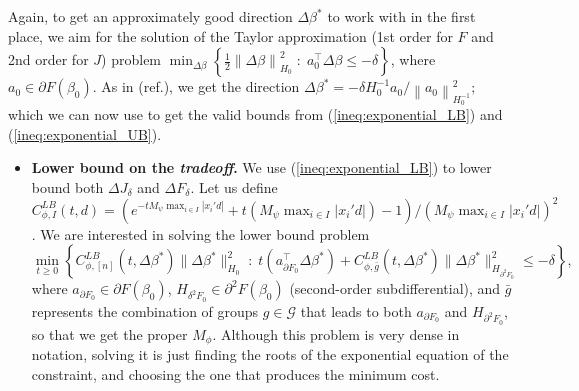 \documentclass[11pt]{article}
\theoremstyle{plain}
\theoremstyle{definition}
\newcommand{\norm}[1]{\left\lVert #1 \right\rVert}
\newcommand{\1}{\mathbf{1}}
\newcommand{\G}{\mathcal{G}}
\renewcommand{\t}{^{\top}}
\begin{document}
Again, to get an approximately good direction $\Delta \beta^*$ to work with in the first place, we aim for the solution of the Taylor approximation (1st order for $F$ and 2nd order for $J$)  problem  $\min_{\Delta \beta } \left\{\frac{1}{2} \norm{\Delta \beta}_{H_0}^2 \;:\; a_0\t \Delta \beta \leq -\delta \right\}$, where $a_0 \in \partial F(\beta_0)$. As in {\color{red} (ref.)}, we get the direction $\Delta \beta^* = -\delta H_0^{-1}a_0/\norm{a_0}^2_{H_0^{-1}}$; which we can now use to get the valid bounds from (\ref{ineq:exponential_LB}) and (\ref{ineq:exponential_UB}).
\begin{itemize}
    \item \noindent \textbf{Lower bound on the \textit{tradeoff}.}
We use (\ref{ineq:exponential_LB}) to lower bound both $\Delta J_\delta$ and $\Delta F_\delta$. Let us define $C_{\phi,I}^{LB}(t,d) = (e^{-tM_\psi \max_{i\in I}|x_i'd|}+t(M_\psi\max_{i\in I}|x_i'd|)-1 )/(M_\psi\max_{i\in I}|x_i'd|)^2$. We are interested in solving the lower bound problem \begin{equation}
\min_{t\geq 0} \left\{ C_{\phi,[n]}^{LB}(t, \Delta \beta^*)\|{\Delta \beta^*}\|_{H_0}^2  \;:\; t(a_{\partial F_0}\t {\Delta \beta^*}) + C_{\phi,\bar{g}}^{LB}(t, \Delta \beta^*)\|{\Delta \beta^*}\|_{H_{\partial^2 F_0}}^2 \leq -\delta \right\},    
\end{equation}
 where $a_{\partial F_0} \in \partial F(\beta_0)$, $H_{\delta^2F_0} \in \partial^2F(\beta_0)$ (second-order subdifferential), and $\bar{g}$ represents the combination of groups $g\in \G$ that leads to both $a_{\partial F_0}$ and $H_{\partial^2 F_0}$, so that we get the proper $M_{\phi}$. Although this problem is very dense in notation, solving it is just finding the roots of the exponential equation of the constraint, and choosing the one that produces the minimum cost. 
\end{itemize}
\end{document}
